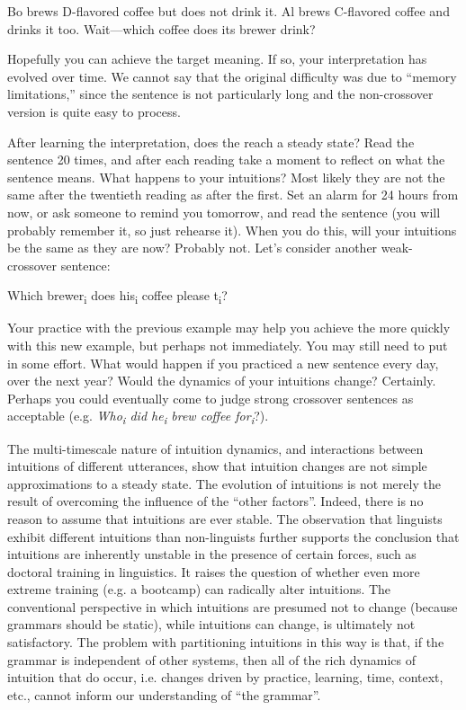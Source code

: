 \ea
\begin{exe}
  {Bo brews D-flavored coffee but does not drink it. Al brews C-flavored coffee and drinks it too.} 
  {Wait—which coffee does its brewer drink?}
\end{exe}
\z

  Hopefully you can achieve the target  meaning. If so, your interpretation has evolved over time. We cannot say that the original difficulty was due to “memory limitations,” since the sentence is not particularly long and the non-crossover version is quite easy to process. 

  After learning the  interpretation, does the  reach a steady state? Read the sentence 20 times, and after each reading take a moment to reflect on what the sentence means. What happens to your intuitions? Most likely they are not the same after the twentieth reading as after the first. Set an alarm for 24 hours from now, or ask someone to remind you tomorrow, and read the sentence (you will probably remember it, so just rehearse it). When you do this, will your intuitions be the same as they are now? Probably not. Let's consider another weak-crossover sentence: 

\ea
Which brewer\textsubscript{i} does his\textsubscript{i} coffee please t\textsubscript{i}?
\z

  Your practice with the previous example may help you achieve the  more quickly with this new example, but perhaps not immediately. You may still need to put in some effort. What would happen if you practiced a new  sentence every day, over the next year? Would the dynamics of your intuitions change? Certainly. Perhaps you could eventually come to judge strong crossover sentences as acceptable (e.g. \textit{Who\textsubscript{i} did he\textsubscript{i} brew coffee for\textsubscript{i}}?). 

  The multi-timescale nature of intuition dynamics, and interactions between intuitions of different utterances, show that intuition changes are not simple approximations to a steady state. The evolution of intuitions is not merely the result of overcoming the influence of the “other factors”. Indeed, there is no reason to assume that intuitions are ever stable. The observation that linguists exhibit different intuitions than non-linguists \citep{Spencer1973} further supports the conclusion that intuitions are inherently unstable in the presence of certain  forces, such as doctoral training in linguistics. It raises the question of whether even more extreme training (e.g. a  bootcamp) can radically alter intuitions. The conventional perspective in which  intuitions are presumed not to change (because grammars should be static), while  intuitions can change, is ultimately not satisfactory. The problem with partitioning intuitions in this way is that, if the grammar is independent of other systems, then all of the rich dynamics of intuition that do occur, i.e. changes driven by practice, learning, time, context, etc., cannot inform our understanding of “the grammar”.

